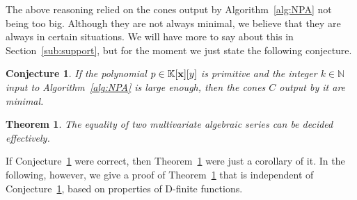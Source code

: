 \documentclass[a4paper,draft]{amsart}
\newtheorem{Theorem}{Theorem}
\newtheorem{Conjecture}{Conjecture}
\theoremstyle{definition}
\begin{document}
The above reasoning relied on the cones output by Algorithm~\ref{alg:NPA} not being too big. Although they are not always minimal, we believe that they are always in certain situations. We will have more to say about this in Section~\ref{sub:support}, but for the moment we just state the following conjecture.
 
\begin{Conjecture}\label{conj:minimality}
If the polynomial $p\in\mathbb{K}[\bold{x}][y]$ is primitive and the integer $k\in\mathbb{N}$ input to Algorithm~\ref{alg:NPA} is large enough, then the cones $C$ output by it are minimal.
\end{Conjecture}

\begin{Theorem}\label{thm:equality}
The equality of two multivariate algebraic series can be decided effectively.
\end{Theorem}
If Conjecture~\ref{conj:minimality} were correct, then Theorem~\ref{thm:equality} were just a corollary of it. In the following, however, we give a proof of Theorem~\ref{thm:equality} that is independent of Conjecture~\ref{conj:minimality}, based on properties of D-finite functions.
\end{document}
